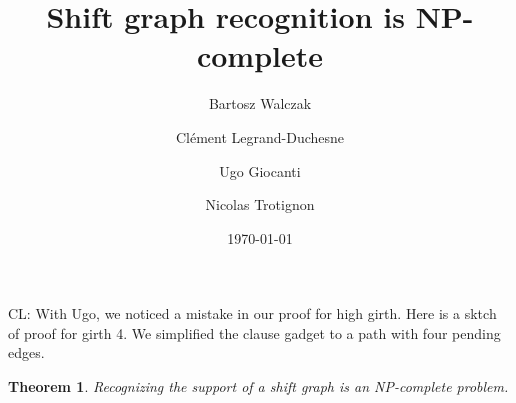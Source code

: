 \documentclass[11pt,a4aper]{article}
\title{Shift graph recognition is NP-complete}
\date{\today}
\author{
Bartosz Walczak\footnotemark[1] \and 
Cl\'ement Legrand-Duchesne\footnotemark[1]\and
Ugo Giocanti\footnotemark[1] \and
Nicolas Trotignon\footnotemark[4]
}
\newtheorem{theorem}{Theorem}
\theoremstyle{definition}
\newcommand{\clement}[1]{{\color{orange} CL: #1}}
\begin{document}
\maketitle

\renewcommand{\thefootnote}{\fnsymbol{footnote}} %

\footnotetext[2]{}

\renewcommand{\thefootnote}{\arabic{footnote}} %

\begin{abstract}
\end{abstract}

\clement{With Ugo, we noticed a mistake in our proof for high girth. Here is a
  sktch of proof for girth 4. We simplified the clause gadget to a path with
  four pending edges.}
\begin{theorem}
  Recognizing the support of a shift graph is an NP-complete problem.
\end{theorem}
\end{document}
